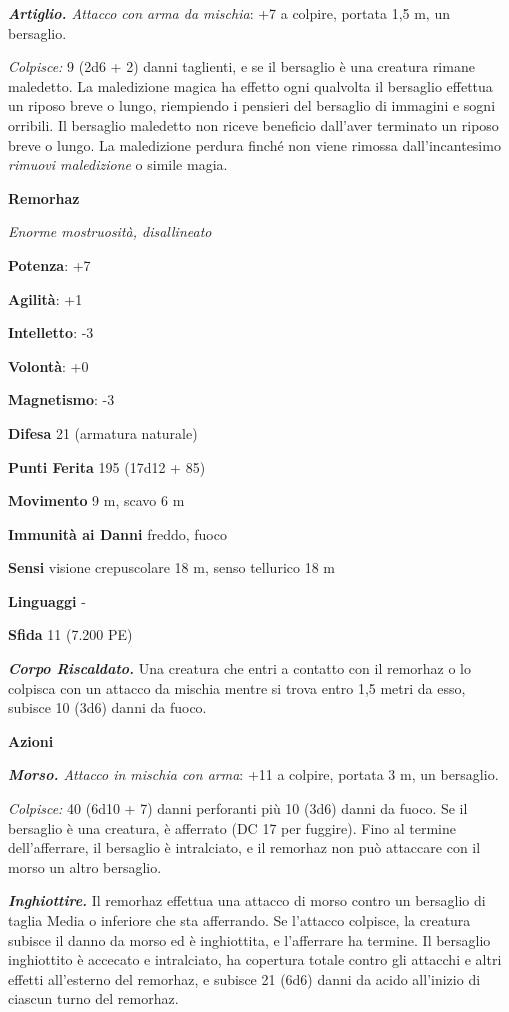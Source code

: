 \begin{multicols}{2}
\emph{\textbf{Artiglio.} Attacco con arma da mischia}: +7 a colpire,
portata 1,5 m, un bersaglio.

\emph{Colpisce:} 9 (2d6 + 2) danni taglienti, e se il bersaglio è una
creatura rimane maledetto. La maledizione magica ha effetto ogni
qualvolta il bersaglio effettua un riposo breve o lungo, riempiendo i
pensieri del bersaglio di immagini e sogni orribili. Il bersaglio
maledetto non riceve beneficio dall'aver terminato un riposo breve o
lungo. La maledizione perdura finché non viene rimossa dall'incantesimo
\emph{rimuovi maledizione} o simile magia.



\textbf{Remorhaz}

\emph{Enorme mostruosità, disallineato}

\textbf{Potenza}: +7

\textbf{Agilità}: +1

\textbf{Intelletto}: -3

\textbf{Volontà}: +0

\textbf{Magnetismo}: -3

\textbf{Difesa} 21 (armatura naturale)

\textbf{Punti Ferita} 195 (17d12 + 85)

\textbf{Movimento} 9 m, scavo 6 m

\textbf{Immunità ai Danni} freddo, fuoco

\textbf{Sensi} visione crepuscolare 18 m, senso tellurico 18 m

\textbf{Linguaggi} -

\textbf{Sfida} 11 (7.200 PE)

\emph{\textbf{Corpo Riscaldato.}} Una creatura che entri a contatto con
il remorhaz o lo colpisca con un attacco da mischia mentre si trova
entro 1,5 metri da esso, subisce 10 (3d6) danni da fuoco.

\textbf{Azioni}

\emph{\textbf{Morso.} Attacco in mischia con arma}: +11 a colpire,
portata 3 m, un bersaglio.

\emph{Colpisce:} 40 (6d10 + 7) danni perforanti più 10 (3d6) danni da
fuoco. Se il bersaglio è una creatura, è afferrato (DC 17 per fuggire).
Fino al termine dell'afferrare, il bersaglio è intralciato, e il
remorhaz non può attaccare con il morso un altro bersaglio.

\emph{\textbf{Inghiottire.}} Il remorhaz effettua una attacco di morso
contro un bersaglio di taglia Media o inferiore che sta afferrando. Se
l'attacco colpisce, la creatura subisce il danno da morso ed è
inghiottita, e l'afferrare ha termine. Il bersaglio inghiottito è
accecato e intralciato, ha copertura totale contro gli attacchi e altri
effetti all'esterno del remorhaz, e subisce 21 (6d6) danni da acido
all'inizio di ciascun turno del remorhaz.


\end{multicols}
